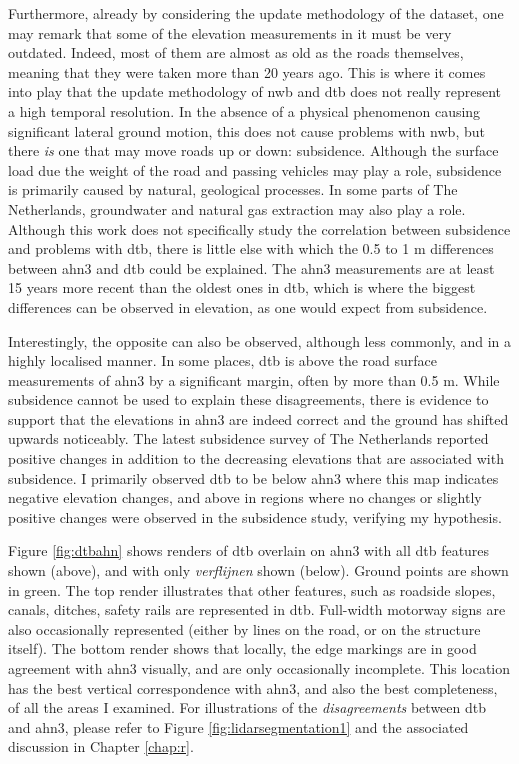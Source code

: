 Furthermore, already by considering the update methodology of the dataset, one may remark that some of the elevation measurements in it must be very outdated. Indeed, most of them are almost as old as the roads themselves, meaning that they were taken more than 20 years ago. This is where it comes into play that the update methodology of \ac{nwb} and \ac{dtb} does not really represent a high temporal resolution. In the absence of a physical phenomenon causing significant lateral ground motion, this does not cause problems with \ac{nwb}, but there \textit{is} one that may move roads up or down: subsidence. Although the surface load due the weight of the road and passing vehicles may play a role, subsidence is primarily caused by natural, geological processes. In some parts of The Netherlands, groundwater and natural gas extraction may also play a role. Although this work does not specifically study the correlation between subsidence and problems with \ac{dtb}, there is little else with which the 0.5 to 1 m differences between \ac{ahn3} and \ac{dtb} could be explained. The \ac{ahn3} measurements are at least 15 years more recent than the oldest ones in \ac{dtb}, which is where the biggest differences can be observed in elevation, as one would expect from subsidence.

Interestingly, the opposite can also be observed, although less commonly, and in a highly localised manner. In some places, \ac{dtb} is above the road surface measurements of \ac{ahn3} by a significant margin, often by more than 0.5 m. While subsidence cannot be used to explain these disagreements, there is evidence to support that the elevations in \ac{ahn3} are indeed correct and the ground has shifted upwards noticeably. The latest subsidence survey of The Netherlands reported positive changes in addition to the decreasing elevations that are associated with subsidence. I primarily observed \ac{dtb} to be below \ac{ahn3} where this map indicates negative elevation changes, and above in regions where no changes or slightly positive changes were observed in the subsidence study, verifying my hypothesis.

Figure \ref{fig:dtbahn} shows renders of \ac{dtb} overlain on \ac{ahn3} with all \ac{dtb} features shown (above), and with only \textit{verflijnen} shown (below). Ground points are shown in green. The top render illustrates that other features, such as roadside slopes, canals, ditches, safety rails are represented in \ac{dtb}. Full-width motorway signs are also occasionally represented (either by lines on the road, or on the structure itself). The bottom render shows that locally, the edge markings are in good agreement with \ac{ahn3} visually, and are only occasionally incomplete. This location has the best vertical correspondence with \ac{ahn3}, and also the best completeness, of all the areas I examined. For illustrations of the \textit{disagreements} between \ac{dtb} and \ac{ahn3}, please refer to Figure \ref{fig:lidarsegmentation1} and the associated discussion in Chapter \ref{chap:r}.

